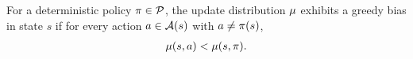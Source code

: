 \begin{definition}
\label{asp: on-policy bias}
For a deterministic policy $\pi \in \mathcal{P}$,
the update distribution $\mu$
exhibits a greedy bias in state $s$
if for every action $a \in \mathcal{A}(s)$ with $a \neq \pi(s)$,
\vspace{-0.3cm}
\begin{align*}
    \mu(s, a) < \mu(s, \pi) .
\end{align*}
\end{definition}
